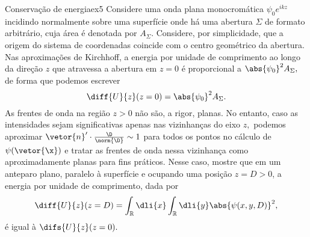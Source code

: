 \begin{exercício}{Conservação de energia}{ex5}
    Considere uma onda plana monocromática \(\psi_0 e^{ikz}\) incidindo normalmente sobre uma superfície onde há uma abertura \(\Sigma\) de formato arbitrário, cuja área é denotada por \(A_{\Sigma}.\) Considere, por simplicidade, que a origem do sistema de coordenadas coincide com o centro geométrico da abertura. Nas aproximações de Kirchhoff, a energia por unidade de comprimento ao longo da direção \(z\) que atravessa a abertura em \(z = 0\) é proporcional a \(\abs{\psi_0}^2 A_\Sigma,\) de forma que podemos escrever
    \begin{equation*}
        \diff{U}{z}(z = 0) = \abs{\psi_0}^2 A_{\Sigma}.
    \end{equation*}
    As frentes de onda na região \(z > 0\) não são, a rigor, planas. No entanto, caso as intensidades sejam significativas apenas nas vizinhanças do eixo \(z,\) podemos aproximar \(\vetor{n}'\cdot \frac{\D}{\norm{\D}} \sim 1\) para todos os pontos no cálculo de \(\psi(\vetor{\x})\) e tratar as frentes de onda nessa vizinhança como aproximadamente planas para fins práticos. Nesse caso, mostre que em um anteparo plano, paralelo à superfície e ocupando uma posição \(z = D > 0\), a energia por unidade de comprimento, dada por
    \begin{equation*}
        \diff{U}{z}(z = D) = \int_{\mathbb{R}}\dli{x}\int_{\mathbb{R}} \dli{y} \abs{\psi(x, y, D)}^2,
    \end{equation*}
    é igual à \(\difs{U}{z}(z = 0).\)
\end{exercício}
